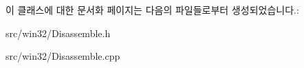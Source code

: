 이 클래스에 대한 문서화 페이지는 다음의 파일들로부터 생성되었습니다.\+:\begin{DoxyCompactItemize}
\item 
src/win32/Disassemble.\+h\item 
src/win32/Disassemble.\+cpp\end{DoxyCompactItemize}
